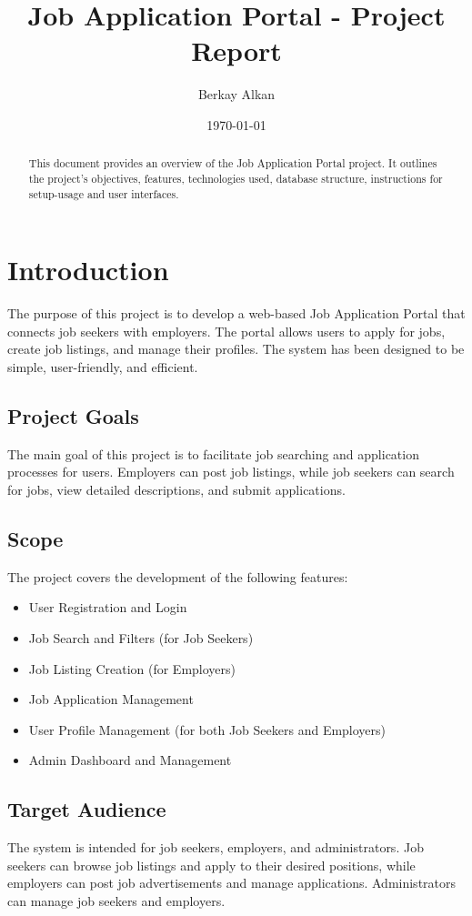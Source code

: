 \documentclass[a4paper,12pt]{article}
\title{Job Application Portal - Project Report}
\author{Berkay Alkan}
\date{\today}
\begin{document}
\maketitle

\begin{abstract}
This document provides an overview of the Job Application Portal project. It outlines the project’s objectives, features, technologies used, database structure, instructions for setup-usage and user interfaces.
\end{abstract}

\tableofcontents
\newpage

\listoffigures
\newpage


\section{Introduction}
The purpose of this project is to develop a web-based Job Application Portal that connects job seekers with employers. The portal allows users to apply for jobs, create job listings, and manage their profiles. The system has been designed to be simple, user-friendly, and efficient.

\subsection{Project Goals}
The main goal of this project is to facilitate job searching and application processes for users. Employers can post job listings, while job seekers can search for jobs, view detailed descriptions, and submit applications.

\subsection{Scope}
The project covers the development of the following features:
\begin{itemize}
    \item User Registration and Login
    \item Job Search and Filters (for Job Seekers)
    \item Job Listing Creation (for Employers)
    \item Job Application Management
    \item User Profile Management (for both Job Seekers and Employers)
    \item Admin Dashboard and Management
\end{itemize}

\subsection{Target Audience}
The system is intended for job seekers, employers, and administrators. Job seekers can browse job listings and apply to their desired positions, while employers can post job advertisements and manage applications. Administrators can manage job seekers and employers.
\end{document}
